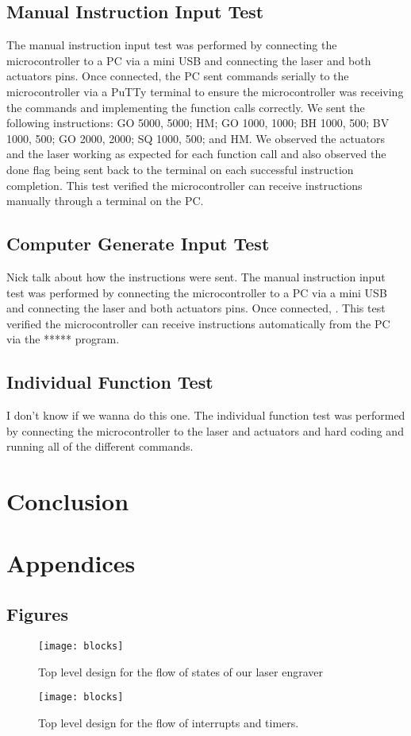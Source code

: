 \documentclass[11pt]{LaTeX-Classes/math-hw}
\begin{document}
\subsection{Manual Instruction Input Test}
The manual instruction input test was performed by connecting the microcontroller to a PC via a mini USB and connecting the laser and both actuators pins. Once connected, the PC sent commands serially to the microcontroller via a PuTTy terminal to ensure the microcontroller was receiving the commands and implementing the function calls correctly. We sent the following instructions: GO 5000, 5000; HM; GO 1000, 1000; BH 1000, 500; BV 1000, 500; GO 2000, 2000; SQ 1000, 500; and HM. We observed the actuators and the laser working as expected for each function call and also observed the done flag being sent back to the terminal on each successful instruction completion. This test verified the microcontroller can receive instructions manually through a terminal on the PC.

\subsection{Computer Generate Input Test} Nick talk about how the instructions were sent.
The manual instruction input test was performed by connecting the microcontroller to a PC via a mini USB and connecting the laser and both actuators pins. Once connected, . This test verified the microcontroller can receive instructions automatically from the PC via the ***** program.

\subsection{Individual Function Test} I don't know if we wanna do this one.
The individual function test was performed by connecting the microcontroller to the laser and actuators and hard coding and running all of the different commands.  

\section*{Conclusion}


\section*{Appendices}
\subsection{Figures}
 \begin{figure}[H]
   \begin{center}
     \texttt{[image: blocks]}
     \caption{Top level design for the flow of states of our laser engraver}
     \label{fig:blockdiagram}
   \end{center}
 \end{figure}

\begin{figure}[H]
	   \begin{center}
	     \texttt{[image: blocks]}
	     \caption{Top level design for the flow of interrupts and timers.}
	     \label{fig:mcwiringdiagram}
	   \end{center}
	 \end{figure}
\end{document}
